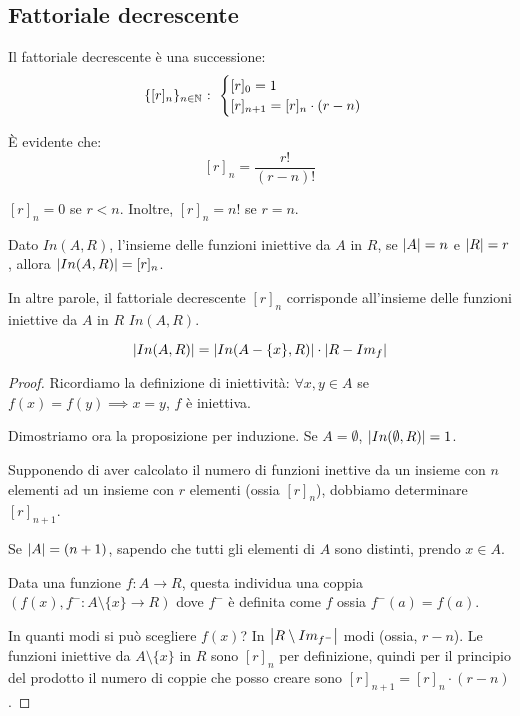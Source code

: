 \subsection{Fattoriale decrescente}

\begin{defn}
Il fattoriale decrescente \`e una successione:
\begin{equation}
\{[r]_n\}_{n \in \mathbb{N}} \text{ : }
\begin{cases}
[r]_0 = 1 \\
[r]_{n+1} = [r]_n \cdot (r - n)
\end{cases}
\end{equation}
\end{defn}
\`E evidente che:
\[
[r]_n = \frac{r!}{(r-n)!}
\]

\begin{oss}
$[r]_n = 0$ se $r < n$. Inoltre, $[r]_n = n!$ se $r = n$.
\end{oss}

\begin{prop}
Dato $In(A,R)$, l'insieme delle funzioni iniettive da $A$ in $R$, se $\left\lvert{A}\right\rvert = n$ e $\left\lvert{R}\right\rvert = r$, allora $\left\lvert{In (A,R)}\right\rvert = [r]_n$.

In altre parole, il fattoriale decrescente $[r]_n$ corrisponde all'insieme delle funzioni iniettive da $A$ in $R$ $In(A,R)$.

\[
\left\lvert{In(A,R)}\right\rvert = \left\lvert{In (A- \{x\},R)}\right\rvert \cdot \left\lvert{R - Im_{f}}\right\rvert
\]

\end{prop}
\begin{proof}
Ricordiamo la definizione di iniettivit\`a: $\forall x, y \in A$ se $f(x) = f(y) \implies x = y$, $f$ \`e iniettiva.

Dimostriamo ora la proposizione per induzione. Se $A = \emptyset$, $\left\lvert{In(\emptyset, R)}\right\rvert = 1$.

Supponendo di aver calcolato il numero di funzioni inettive da un insieme con $n$ elementi ad un insieme con $r$ elementi (ossia $[r]_n$), dobbiamo determinare $[r]_{n+1}$.

Se $\left\lvert{A}\right\rvert = (n+1)$, sapendo che tutti gli elementi di $A$ sono distinti, prendo $x \in A$.

Data una funzione $f : A \to R$, questa individua una coppia $(f(x), f^{-} : A \setminus \{ x \} \to R)$ dove $f^{-}$ \`e definita come $f$ ossia $f^{-} (a) = f(a)$.

In quanti modi si pu\`o scegliere $f(x)$? In $\left\lvert{R \setminus Im_{f^-}}\right\rvert$ modi (ossia, $r - n$). Le funzioni iniettive da $A \setminus \{ x \}$ in $R$ sono $[r]_n$ per definizione, quindi per il principio del prodotto il numero di coppie che posso creare sono $[r]_{n+1} = [r]_n \cdot (r - n)$.
\end{proof}

